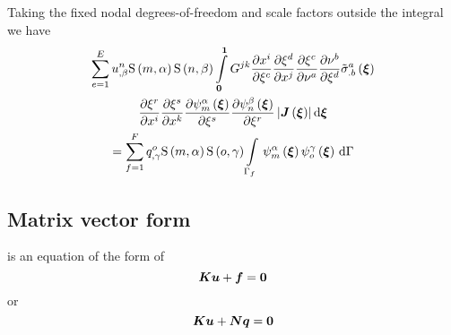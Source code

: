 Taking the fixed nodal degrees-of-freedom and scale factors outside the integral we have
\begin{multline}
  \dsum_{e=1}^{E}\nodedof{u}{n}{\beta}\gsf{m}{\alpha}\gsf{n}{\beta}
  \dintl{\vectr{0}}{\vectr{1}}G^{jk}\delby{x^{i}}{\xi^{c}}
  \delby{\xi^{d}}{x^{j}}\delby{\xi^{c}}{\nu^{a}}
  \delby{\nu^{b}}{\xi^{d}}\fnof{{\tilde{\sigma}}^{a}_{.b}}{\vectr{\xi}} \\
  \delby{\xi^{r}}{x^{i}}\delby{\xi^{s}}{x^{k}}
  \delby{\gbfn{m}{\alpha}{\vectr{\xi}}}{\xi^{s}}
  \delby{\gbfn{n}{\beta}{\vectr{\xi}}}{\xi^{r}}
  \abs{\fnof{\matr{J}}{\vectr{\xi}}}\exteriorderiv{\vectr{\xi}} \\
  = \dsum_{f=1}^{F}\nodedof{q}{o}{\gamma}\gsf{m}{\alpha}\gsf{o}{\gamma}
  \gint{\Gamma_{f}}{}{\gbfn{m}{\alpha}{\vectr{\xi}}\gbfn{o}{\gamma}{\vectr{\xi}}}{\Gamma}
  \label{eqn:elementalfem1}
\end{multline}

\subsection{Matrix vector form}

 is an equation of the form of
\begin{equation}
  \matr{K}\vect{u}+\vect{f}=\vect{0}
\end{equation}
or
\begin{equation}
  \matr{K}\vect{u}+\matr{N}\vectr{q}=\vect{0}
\end{equation}

